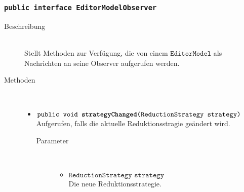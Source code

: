 \subsubsection{\normalfont \texttt{public interface \textbf{EditorModelObserver}}}

\begin{description}
\item[Beschreibung] \hfill \\ Stellt Methoden zur Verfügung, die von einem $\texttt{EditorModel}$ als Nachrichten an seine Observer aufgerufen werden.

\item[Methoden] \hfill \\
	\vspace{-.8cm}
	\begin{itemize}
		\item $\texttt{public void \textbf{strategyChanged}(ReductionStrategy strategy)}$ \\ Aufgerufen, falls die aktuelle Reduktionsstragie geändert wird.
		\begin{description}
			\item[Parameter] \hfill \\
			\vspace{-.8cm}
			\begin{itemize}
				\item $\texttt{ReductionStrategy strategy}$ \\ Die neue Reduktionsstrategie.
			\end{itemize}
		\end{description}
	\end{itemize}
\end{description}
